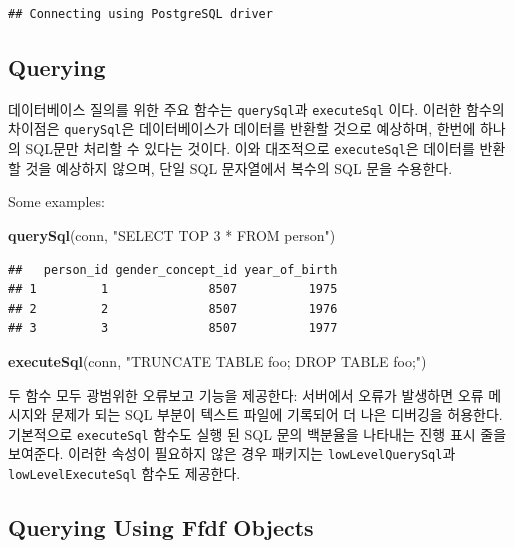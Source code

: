 \documentclass[11pt]{book}
\newenvironment{Shaded}{\begin{snugshade}}{\end{snugshade}}
\newcommand{\KeywordTok}[1]{\textcolor[rgb]{0.13,0.29,0.53}{\textbf{#1}}}
\newcommand{\StringTok}[1]{\textcolor[rgb]{0.31,0.60,0.02}{#1}}
\newcommand{\NormalTok}[1]{#1}
\theoremstyle{definition}
\theoremstyle{definition}
\theoremstyle{definition}
\theoremstyle{remark}
\begin{document}
\begin{verbatim}
## Connecting using PostgreSQL driver
\end{verbatim}

\subsection{Querying}\label{querying}

데이터베이스 질의를 위한 주요 함수는 \texttt{querySql}과
\texttt{executeSql} 이다. 이러한 함수의 차이점은 \texttt{querySql}은
데이터베이스가 데이터를 반환할 것으로 예상하며, 한번에 하나의 SQL문만
처리할 수 있다는 것이다. 이와 대조적으로 \texttt{executeSql}은 데이터를
반환할 것을 예상하지 않으며, 단일 SQL 문자열에서 복수의 SQL 문을
수용한다. 

Some examples:

\begin{Shaded}
\begin{Highlighting}[]
\KeywordTok{querySql}\NormalTok{(conn, }\StringTok{"SELECT TOP 3 * FROM person"}\NormalTok{)}
\end{Highlighting}
\end{Shaded}

\begin{verbatim}
##   person_id gender_concept_id year_of_birth
## 1         1              8507          1975
## 2         2              8507          1976
## 3         3              8507          1977
\end{verbatim}

\begin{Shaded}
\begin{Highlighting}[]
\KeywordTok{executeSql}\NormalTok{(conn, }\StringTok{"TRUNCATE TABLE foo; DROP TABLE foo;"}\NormalTok{)}
\end{Highlighting}
\end{Shaded}

두 함수 모두 광범위한 오류보고 기능을 제공한다: 서버에서 오류가 발생하면
오류 메시지와 문제가 되는 SQL 부분이 텍스트 파일에 기록되어 더 나은
디버깅을 허용한다. 기본적으로 \texttt{executeSql} 함수도 실행 된 SQL
문의 백분율을 나타내는 진행 표시 줄을 보여준다. 이러한 속성이 필요하지
않은 경우 패키지는 \texttt{lowLevelQuerySql}과
\texttt{lowLevelExecuteSql} 함수도 제공한다.

\subsection{Querying Using Ffdf
Objects}\label{querying-using-ffdf-objects}
\end{document}
